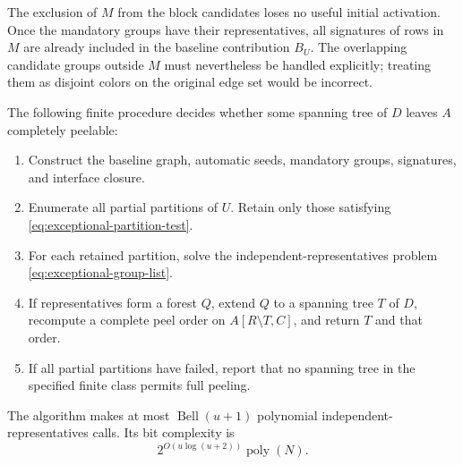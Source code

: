 The exclusion of $M$ from the block candidates loses no useful initial
activation.  Once the mandatory groups have their representatives, all
signatures of rows in $M$ are already included in the baseline contribution
$B_U$.  The overlapping candidate groups outside $M$ must nevertheless be
handled explicitly; treating them as disjoint colors on the original
edge set would be incorrect.

\begin{theorem}
\label{thm:exceptional-selector}
The following finite procedure decides whether some spanning tree of $D$
leaves $A$ completely peelable:
\begin{enumerate}
\item Construct the baseline graph, automatic seeds, mandatory groups,
      signatures, and interface closure.
\item Enumerate all partial partitions of $U$.  Retain only those
      satisfying \eqref{eq:exceptional-partition-test}.
\item For each retained partition, solve the independent-representatives
      problem \eqref{eq:exceptional-group-list}.
\item If representatives form a forest $Q$, extend $Q$ to a spanning
      tree $T$ of $D$, recompute a complete peel order on
      $A[R\setminus T,C]$, and return $T$ and that order.
\item If all partial partitions have failed, report that no spanning
      tree in the specified finite class permits full peeling.
\end{enumerate}
The algorithm makes at most $\operatorname{Bell}(u+1)$ polynomial
independent-representatives calls.  Its bit complexity is
\begin{equation}
       2^{O(u\log(u+2))}\operatorname{poly}(N).
       \label{eq:exceptional-fpt}
\end{equation}
\end{theorem}

